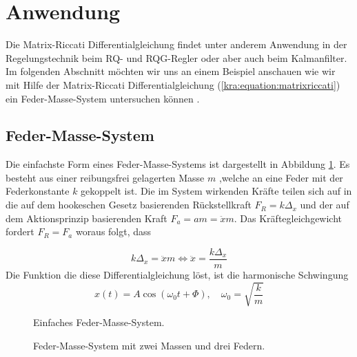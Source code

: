 \section{Anwendung \label{kra:section:anwendung}}
\newcommand{\dt}[0]{\frac{d}{dt}}

Die Matrix-Riccati Differentialgleichung findet unter anderem Anwendung in der Regelungstechnik beim RQ- und RQG-Regler oder aber auch beim Kalmanfilter.
Im folgenden Abschnitt möchten wir uns an einem Beispiel anschauen wie wir mit Hilfe der Matrix-Riccati Differentialgleichung (\ref{kra:equation:matrixriccati}) ein Feder-Masse-System untersuchen können \cite{kra:riccati}.

\subsection{Feder-Masse-System}
Die einfachste Form eines Feder-Masse-Systems ist dargestellt in Abbildung \ref{kra:fig:simple_mass_spring}.
Es besteht aus einer reibungsfrei gelagerten Masse $m$ ,welche an eine Feder mit der Federkonstante $k$ gekoppelt ist.
Die im System wirkenden Kräfte teilen sich auf in die auf dem hookeschen Gesetz basierenden Rückstellkraft $F_R = k \Delta_x$ und der auf dem Aktionsprinzip basierenden Kraft $F_a = am = \ddot{x} m$.
Das Kräftegleichgewicht fordert $F_R = F_a$ woraus folgt, dass

\begin{equation*}
    k \Delta_x = \ddot{x} m \Leftrightarrow \ddot{x} = \frac{k \Delta_x}{m}
\end{equation*}
Die Funktion die diese Differentialgleichung löst, ist die harmonische Schwingung
\begin{equation}
    x(t) = A \cos(\omega_0 t + \Phi), \quad \omega_0 = \sqrt{\frac{k}{m}}
\end{equation}
\begin{figure}
    
    \caption{Einfaches Feder-Masse-System.}
    \label{kra:fig:simple_mass_spring}
\end{figure}
\begin{figure}
    
    \caption{Feder-Masse-System mit zwei Massen und drei Federn.}
    \label{kra:fig:multi_mass_spring}
\end{figure}

